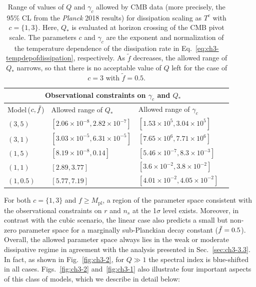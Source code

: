 \begin{table}[ht!]
\def\arraystretch{1.5}
\centering
    \begin{tabular}{l>{\raggedleft}p{}>{\raggedleft\arraybackslash}p{}>{\raggedleft\arraybackslash}p{}}
    \toprule
     \hline
     \multicolumn{3}{c}{Observational constraints on $\gamma_c$ and $Q_{*}$}\\
     \hline
Model\,($c,\Tilde{f}$) & Allowed range of $Q_{*}$ & Allowed range of $\gamma_c$\\
    \hline
    $(3,5)$ & $[2.06\times 10^{-8},2.82\times 10^{-7}]$ & $[1.53\times10^5,3.04\times10^5]$ \\
    $(3,1)$ & $[3.03\times10^{-5},6.31\times 10^{-5}]$ & $[7.65\times10^6,7.71\times10^6]$\\
    $(1,5)$ & $[8.19\times 10^{-8}, 0.14]$ & $[5.46\times 10^{-7},8.3\times 10^{-3}]$\\
    $(1,1)$ & $[2.89, 3.77]$ & $[3.6\times 10^{-2},3.8\times 10^{-2}]$ \\
    $(1,0.5)$ & $[5.77,7.19]$ & $[4.01\times 10^{-2},4.05\times 10^{-2}]$\\
    \hline
    \bottomrule
    \end{tabular}
    \caption[Observational constraints on dissipation parameters]{Range of values of $Q$ and $\gamma_c$ allowed by CMB data (more precisely, the 95\% CL from the \textit{Planck} 2018 results) for dissipation scaling as $T^c$ with $c=\{1,3\}$. Here, $Q_*$ is evaluated at horizon crossing of the CMB pivot scale. The parameters $c$ and $\gamma_c$ are the exponent and normalization of the temperature dependence of the dissipation rate in Eq.~\ref{eq:ch3-tempdepofdissipation}, respectively. As $\tilde f$ decreases, the allowed range of $Q_*$ narrows, so that there is no acceptable value of $Q$ left for the case of $c=3$ with $\tilde f = 0.5$.}
    \label{tab:ch3-1}
\end{table}

For both $c=\{1,3\}$ and $f\geq M_\mathrm{pl}$, a region of the parameter space consistent with the observational constraints on $r$ and $n_s$ at the 1$\sigma$ level exists. Moreover, in contrast with the cubic scenario, the linear case also predicts a small but non-zero parameter space for a marginally sub-Planckian decay constant ($\Tilde{f}=0.5$). Overall, the allowed parameter space always lies in the weak or moderate dissipative regime in agreement with the analysis presented in Sec.~\ref{sec:ch3-3.3}. In fact, as shown in Fig.~\ref{fig:ch3-2}, for $Q\gg 1$ the spectral index is blue-shifted in all cases. Figs.~\ref{fig:ch3-2} and~\ref{fig:ch3-1} also illustrate four important aspects of this class of models, which we describe in detail below:

